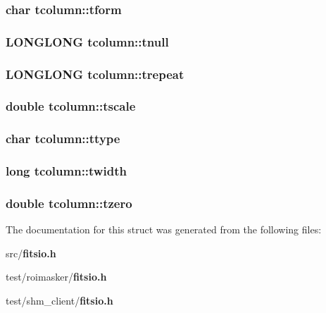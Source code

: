 \subsubsection{\setlength{\rightskip}{0pt plus 5cm}char \bf{tcolumn::tform}}\label{structtcolumn_609257ec1c8279fdf64be8375c0609b2}


\subsubsection{\setlength{\rightskip}{0pt plus 5cm}\bf{LONGLONG} \bf{tcolumn::tnull}}\label{structtcolumn_ed35d391d722390693403b9c9f0649e1}


\subsubsection{\setlength{\rightskip}{0pt plus 5cm}\bf{LONGLONG} \bf{tcolumn::trepeat}}\label{structtcolumn_4d734519fdd15fc3261c374d351df0c0}


\subsubsection{\setlength{\rightskip}{0pt plus 5cm}double \bf{tcolumn::tscale}}\label{structtcolumn_cc57a3fa41ea199bb8bd6a231b6f6ba4}


\subsubsection{\setlength{\rightskip}{0pt plus 5cm}char \bf{tcolumn::ttype}}\label{structtcolumn_425c648c5f2fa56c925169e50c1f064a}


\subsubsection{\setlength{\rightskip}{0pt plus 5cm}long \bf{tcolumn::twidth}}\label{structtcolumn_f99694f559adfc395190b82bb702b255}


\subsubsection{\setlength{\rightskip}{0pt plus 5cm}double \bf{tcolumn::tzero}}\label{structtcolumn_1116351871bcec610d1b835d6fc53b77}




The documentation for this struct was generated from the following files:\begin{CompactItemize}
\item 
src/\bf{fitsio.h}\item 
test/roimasker/\bf{fitsio.h}\item 
test/shm\_\-client/\bf{fitsio.h}\end{CompactItemize}
